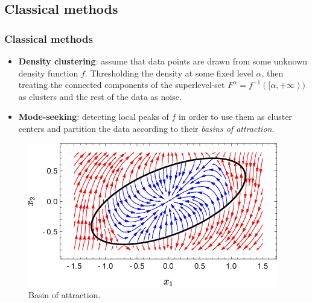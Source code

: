 \documentclass{beamer}
\theoremstyle{definition}
\begin{document}
\subsection{Classical methods}
\begin{frame}
\frametitle{Classical methods}
\begin{itemize}
\frametitle{}
\item \textbf{Density clustering}: assume that data points are drawn from
some unknown density function $f$. Thresholding the density at some fixed level $\alpha$, then treating the connected components
of the superlevel-set $F^{\alpha} = f^{-1}([\alpha,+\infty))$ as clusters and the rest of the data as noise. %
\item \textbf{Mode-seeking}: detecting local peaks of $f$ in order to use them as cluster centers and partition the data according to their
\emph{basins of attraction}. %
\end{itemize}
\end{frame}

\begin{frame}
\begin{figure}
\includegraphics[scale=0.5]{basin}
\caption{Basin of attraction.}
\end{figure}
\end{frame}
\end{document}

